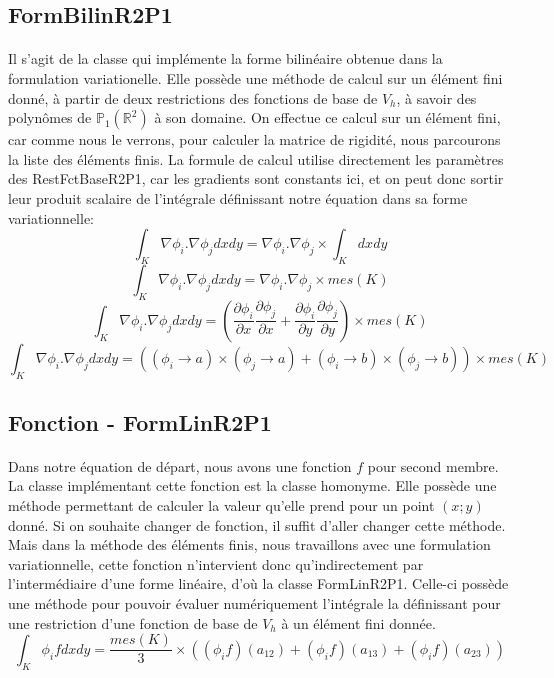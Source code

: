 \subsection{FormBilinR2P1}
\paragraph{} Il s'agit de la classe qui implémente la forme bilinéaire obtenue dans la formulation variationelle. Elle possède une méthode de calcul sur un élément fini donné, à partir de deux restrictions des fonctions de base de $V_h$, à savoir des polynômes de $\mathbb{P}_1(\mathbb{R}^2)$  à son domaine. On effectue ce calcul sur un élément fini, car comme nous le verrons, pour calculer la matrice de rigidité, nous parcourons la liste des éléments finis. La formule de calcul utilise directement les paramètres des RestFctBaseR2P1, car les gradients sont constants ici, et on peut donc sortir leur produit scalaire de l'intégrale définissant notre équation dans sa forme variationnelle:\\
\[ \int_{K}{\nabla \phi _ i . \nabla \phi _ j dxdy} = \nabla \phi _ i . \nabla \phi _ j \times \int_{K}dxdy\]
\[ \int_{K}{\nabla \phi _ i . \nabla \phi _ j dxdy} = \nabla \phi _ i . \nabla \phi _ j \times mes(K)\]
\[ \int_{K}{\nabla \phi _ i . \nabla \phi _ j dxdy} = (\frac{\partial \phi _ i}{\partial x}\frac{\partial \phi _ j}{\partial x}+\frac{\partial \phi _ i}{\partial y}\frac{\partial \phi _ j}{\partial y}) \times mes(K)\]
\[ \int_{K}{\nabla \phi _ i . \nabla \phi _ j dxdy} = ((\phi _ i \rightarrow a)\times(\phi _ j \rightarrow a)+(\phi _ i \rightarrow b)\times(\phi _ j \rightarrow b)) \times mes(K) \]

\subsection{Fonction - FormLinR2P1}
\paragraph{} Dans notre équation de départ, nous avons une fonction $f$ pour second membre. La classe implémentant cette fonction est la classe homonyme. Elle possède une méthode permettant de calculer la valeur qu'elle prend pour un point $(x;y)$ donné. Si on souhaite changer de fonction, il suffit d'aller changer cette méthode.\\

Mais dans la méthode des éléments finis, nous travaillons avec une formulation variationnelle, cette fonction n'intervient donc qu'indirectement par l'intermédiaire d'une forme linéaire, d'où la classe FormLinR2P1. Celle-ci possède une méthode pour pouvoir évaluer numériquement l'intégrale la définissant pour une restriction d'une fonction de base de $V_h$ à un élément fini donnée.\\
\[ \int_{K}{\phi _i f dxdy} = \frac{mes(K)}{3}\times((\phi _i f)(a_{12})+(\phi _i f)(a_{13})+(\phi _i f)(a_{23})) \]

